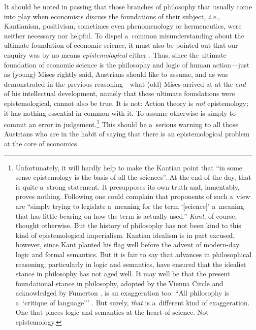 It should be noted in passing that those branches of philosophy that usually come into play when economists discuss the foundations of their subject\textit{, i.e.}, Kantianism, positivism, sometimes even phenomenology or hermeneutics, were neither necessary nor helpful. To dispel a~common misunderstanding about the ultimate foundation of economic science, it must also be pointed out that our enquiry was by no means \textit{epistemological} either 
\parencite*[][]{}. %
 Thus, since the ultimate foundation of economic science is the philosophy and logic of human action---just as (young) Mises rightly said, Austrians should like to assume, and as was demonstrated in the previous reasoning---what (old) Mises arrived at at the \textit{end} of his intellectual development, namely that these ultimate foundations were epistemological, cannot also be true. It is not: Action theory is \textit{not} epistemology; it has nothing essential in common with it. To assume otherwise is simply to commit an error in judgement.\footnote{Unfortunately, it will hardly help to make the Kantian point that ``in some sense epistemology is the basis of all the sciences''. At the end of the day, that is quite a~strong statement. It presupposes its own truth and, lamentably, proves nothing. Following 
\parencite[][p.3]{fumerton_epistemology_2017} %
 one could complain that proponents of such a~view are ``simply trying to legislate a~meaning for the term ‘[science]' a~meaning that has little bearing on how the term is actually used.'' \textit{Kant}, of course, thought otherwise. But the history of philosophy has not been kind to this kind of epistemological imperialism. Kantian idealism is in part excused, however, since Kant planted his flag well before the advent of modern-day logic and formal semantics. But it is fair to say that advances in philosophical reasoning, particularly in logic and semantics, have ensured that the idealist stance in philosophy has not aged well. It may well be that the present foundational stance in philosophy, adopted by the Vienna Circle and acknowledged by Fumerton 
\parencite*[][p.14]{fumerton_epistemology_2017}, %
 is an exaggeration too: ``All philosophy is a~‘critique of language''' 
\parencites[][]{wittgenstein_tractatus_1922}[][]{}. %
 But surely, \textit{that} is a~different kind of exaggeration. One that places logic and semantics at the heart of science. Not epistemology.} This should be a~serious warning to all those Austrians who are in the habit of saying that there is an epistemological problem at the core of economics 

